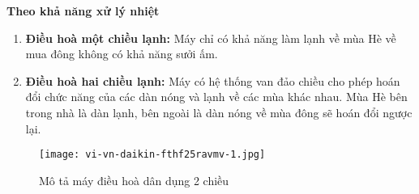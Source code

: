 	\textbf{Theo khả năng xử lý nhiệt}
	\begin{enumerate}
		\setlength\itemsep{1mm}
		\item \textbf{Điều hoà một chiều lạnh:} Máy chỉ có khả năng làm lạnh về mùa Hè về mua đông không có khả năng sưởi ấm.
		
		\item \textbf{Điều hoà hai chiều lạnh:} Máy có hệ thống van đảo chiều cho phép hoán đổi chức năng của các dàn nóng và lạnh về các mùa khác nhau. Mùa Hè bên trong nhà là dàn lạnh, bên ngoài là dàn nóng về mùa đông sẽ hoán đổi ngược lại.
	\end{enumerate}
	
\begin{figure}[H]
	\centering
	\texttt{[image: vi-vn-daikin-fthf25ravmv-1.jpg]}
	\caption{Mô tả máy điều hoà dân dụng 2 chiều}
\end{figure}
	
